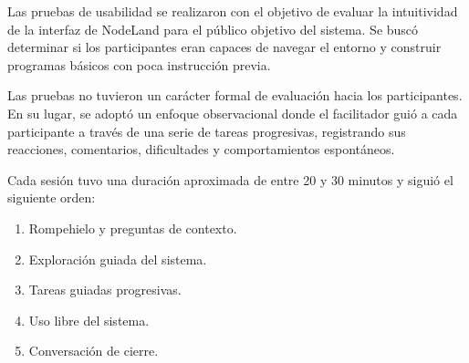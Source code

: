 \label{apx:protocolo-usabilidad}

Las pruebas de usabilidad se realizaron con el objetivo de evaluar la intuitividad de la interfaz de NodeLand para el público objetivo del sistema. Se buscó determinar si los participantes eran capaces de navegar el entorno y construir programas básicos con poca instrucción previa.

Las pruebas no tuvieron un carácter formal de evaluación hacia los participantes. En su lugar, se adoptó un enfoque observacional donde el facilitador guió a cada participante a través de una serie de tareas progresivas, registrando sus reacciones, comentarios, dificultades y comportamientos espontáneos.

Cada sesión tuvo una duración aproximada de entre 20 y 30 minutos y siguió el siguiente orden:

\begin{enumerate}
    \item Rompehielo y preguntas de contexto.
    \item Exploración guiada del sistema.
    \item Tareas guiadas progresivas.
    \item Uso libre del sistema.
    \item Conversación de cierre.
\end{enumerate}

